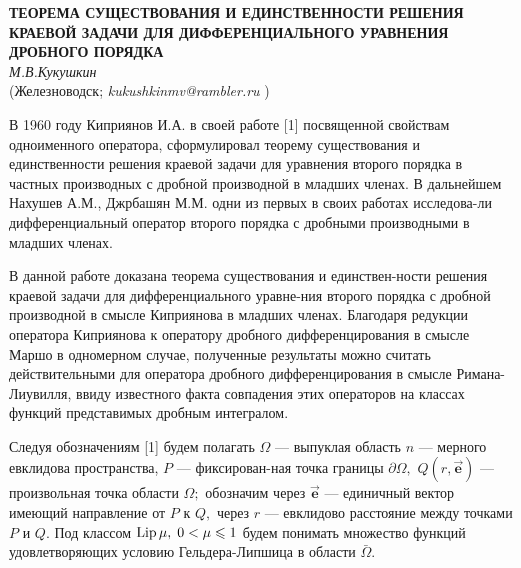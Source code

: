 \begin{center}{ \bf ТЕОРЕМА СУЩЕСТВОВАНИЯ И ЕДИНСТВЕННОСТИ  РЕШЕНИЯ КРАЕВОЙ ЗАДАЧИ ДЛЯ ДИФФЕРЕНЦИАЛЬНОГО УРАВНЕНИЯ ДРОБНОГО ПОРЯДКА}\\
{\it М.В.Кукушкин } \\
(Железноводск; {\it kukushkinmv@rambler.ru} )
\end{center}


  В 1960 году  Киприянов И.А. в своей работе  [1] посвященной свойствам одноименного оператора,
 сформулировал теорему существования и единственности решения краевой задачи для   уравнения  второго порядка в частных производных  с дробной производной в младших членах.
  В дальнейшем   Нахушев А.М., Джрбашян М.М.  одни из первых в своих работах исследова-ли дифференциальный оператор второго порядка с дробными производными в младших членах.

 В данной работе доказана теорема существования и единствен-ности решения краевой задачи для дифференциального уравне-ния второго порядка с дробной производной в смысле Киприянова в младших членах.  Благодаря редукции оператора Киприянова к оператору дробного дифференцирования в смысле Маршо в одномерном случае, полученные результаты можно считать действительными для оператора дробного дифференцирования в смысле Римана-Лиувилля, ввиду известного факта совпадения этих операторов на классах функций представимых дробным интегралом.


  Следуя обозначениям [1] будем полагать $\Omega$ --- выпуклая область $n$ --- мерного евклидова пространства, $P$ --- фиксирован-ная точка границы $\partial\Omega,$
     $Q(r,\vec{\mathbf{e}})$ --- произвольная точка области $\Omega;$
     обозначим через $\vec{\mathbf{e}}$ --- единичный вектор имеющий направление от $P$ к $Q,$ через $r$ --- евклидово расстояние между точками $P$ и $Q.$
    Под классом ${\rm Lip}\, \mu,\;0<\mu\leqslant1 $ будем понимать множество функций удовлетворяющих условию Гельдера-Липшица в области $\bar{\Omega}.$

